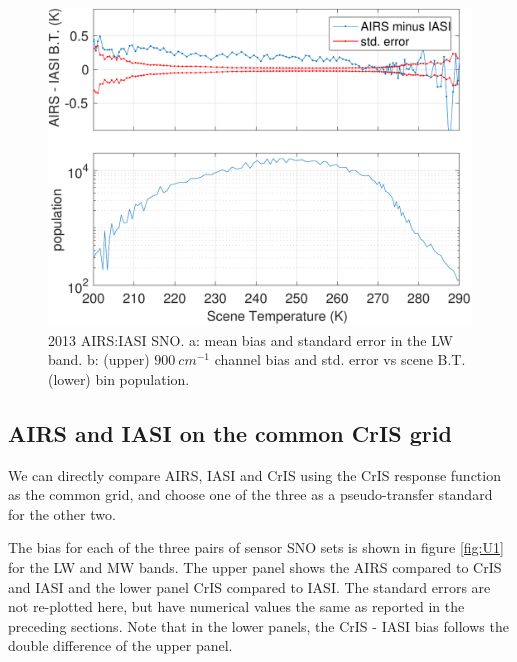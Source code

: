 \documentclass[twocolumn,10pt]{article}
\begin{document}
\begin{figure}[htb]
  \centering
    \includegraphics[width=\linewidth]{./figs/ai_jpl_sno_bias_std_900wn_vs_scene.pdf}
\caption{
  2013 AIRS:IASI SNO. a:  mean bias and standard error in the LW band. b: (upper) $900\ cm^{-1}$ channel bias and std. error vs scene B.T. (lower) bin population.}
\label{fig:Z2}
\end{figure}





\subsection{AIRS and IASI on the common CrIS grid}
 We can directly compare AIRS, IASI and CrIS using the CrIS response function as the common grid, and choose one of the three as a pseudo-transfer standard for the other two.

The bias for each of the three pairs of sensor SNO sets is shown in figure \ref{fig:U1} for the LW and MW bands. The upper panel shows the AIRS compared to CrIS and IASI and the lower panel CrIS compared to IASI.  The standard errors are not re-plotted here, but have numerical values the same as reported in the preceding sections. Note that in the lower panels, the CrIS - IASI bias follows the double difference of the upper panel.  
\end{document}
